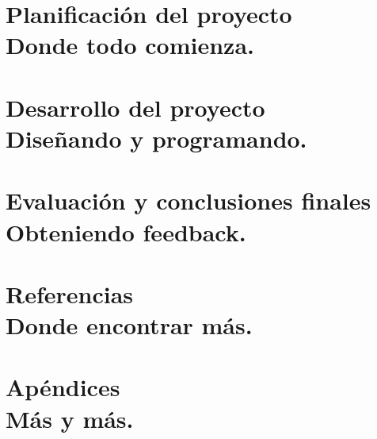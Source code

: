 

\part{Planificación del proyecto \\ \small{Donde todo comienza.}}
% 
% 
% 

\part{Desarrollo del proyecto \\ \small{Diseñando y programando.}}
% 
% 

\part{Evaluación y conclusiones finales \\ \small{Obteniendo feedback.}} 
% 
% 
% 

\part{Referencias \\ \small{Donde encontrar más.}} 



\part{Apéndices \\ \small{Más y más.}}
\appendix
% 
% 

